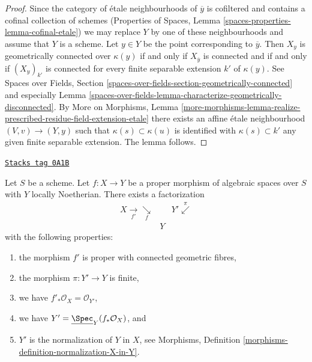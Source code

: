 \begin{proof}
Since the category of \'etale neighbourhoods of $\overline{y}$ is
cofiltered and contains a cofinal collection of schemes
(Properties of Spaces, Lemma \ref{spaces-properties-lemma-cofinal-etale})
we may replace $Y$ by one of these neighbourhoods and assume that
$Y$ is a scheme. Let $y \in Y$ be the point corresponding to $\overline{y}$.
Then $X_y$ is geometrically connected over $\kappa(y)$ if and only if
$X_{\overline{y}}$ is connected and if and only if $(X_y)_{k'}$
is connected for every finite separable extension $k'$ of $\kappa(y)$.
See Spaces over Fields, Section
\ref{spaces-over-fields-section-geometrically-connected} and especially
Lemma \ref{spaces-over-fields-lemma-characterize-geometrically-disconnected}.
By More on Morphisms, Lemma
\ref{more-morphisms-lemma-realize-prescribed-residue-field-extension-etale}
there exists an affine \'etale neighbourhood $(V, v) \to (Y, y)$ such that
$\kappa(s) \subset \kappa(u)$ is identified with $\kappa(s) \subset k'$
any given finite separable extension. The lemma follows.
\end{proof}

\begin{theorem}

\label{spaces-more-morphisms-theorem-stein-factorization-Noetherian}
\href{https://stacks.math.columbia.edu/tag/0A1B}{\texttt{Stacks tag 0A1B}}

Let $S$ be a scheme. Let $f : X \to Y$ be a proper morphism of algebraic
spaces over $S$ with $Y$ locally Noetherian.
There exists a factorization
$$
\begin{array}{ccc}X \underset{f'}{\longrightarrow}\underset{f}{\searrow} &  & Y' \overset{\pi}{\swarrow} \\  & Y & \end{array}
$$
with the following properties:
\begin{enumerate}
\item the morphism $f'$ is proper with connected geometric fibres,
\item the morphism $\pi : Y' \to Y$ is finite,
\item we have $f'_*\mathcal{O}_X = \mathcal{O}_{Y'}$,
\item we have $Y' = \underline{\Spec}_Y(f_*\mathcal{O}_X)$, and
\item $Y'$ is the normalization of $Y$ in $X$, see
Morphisms, Definition \ref{morphisms-definition-normalization-X-in-Y}.
\end{enumerate}
\end{theorem}

